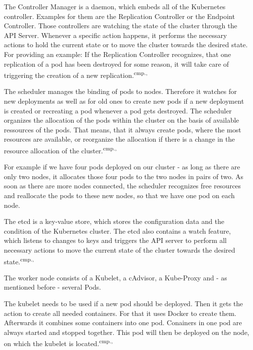 The Controller Manager is a daemon, which embeds all of the Kubernetes controller. Examples for them are the Replication Controller or the Endpoint Controller. Those controllers are watching the state of the cluster through the API Server. Whenever a specific action happens, it performs the necessary actions to hold the current state or to move the cluster towards the desired state. For providing an example: If the Replication Controller recognizes, that one replication of a pod has been destroyed for some reason, it will take care of triggering the creation of a new replication.\textsuperscript{cmp.\cite{19}, \cite{22}}

The scheduler manages the binding of pods to nodes. Therefore it watches for new deployments as well as for old ones to create new pods if a new deployment is created or recreating a pod whenever a pod gets destroyed. The scheduler organizes the allocation of the pods within the cluster on the basis of available ressources of the pods. That means, that it always create pods, where the most resources are available, or reorganize the allocation if there is a change in the resource allocation of the cluster.\textsuperscript{cmp.\cite{19}, \cite{22}}%

For example if we have four pods deployed on our cluster - as long as there are only two nodes, it allocates those four pods to the two nodes in pairs of two. As soon as there are more nodes connected, the scheduler recognizes free resources and reallocate the pods to these new nodes, so that we have one pod on each node.

The etcd is a key-value store, which stores the configuration data and the condition of the Kubernetes cluster. The etcd also contains a watch feature, which listens to changes to keys and triggers the API server to perform all necessary actions to move the current state of the cluster towards the desired state.\textsuperscript{cmp.\cite{19}, \cite{22}}

The worker node consists of a Kubelet, a cAdvisor, a Kube-Proxy and - as mentioned before - several Pods. 

The kubelet needs to be used if a new pod should be deployed. Then it gets the action to create all needed containers. For that it uses Docker to create them. Afterwards it combines some containers into one pod. Conainers in one pod are always started and stopped together. This pod will then be deployed on the node, on which the kubelet is located.\textsuperscript{cmp.\cite{19}, \cite{22}}


